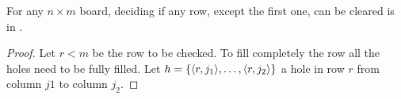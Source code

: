 \begin{lemma0}
For any $n \times m$ board, deciding if any row, except the first one, can be cleared is in \pp.
\end{lemma0}

\begin{proof}
  Let $r < m$ be the row to be checked. To fill completely the row all the holes need to be fully filled. Let $h = \{ \cell[r][j_1], \dots, \cell[r][j_2]\}$ a hole in row $r$ from column $j1$ to column $j_2$.  

\end{proof}
